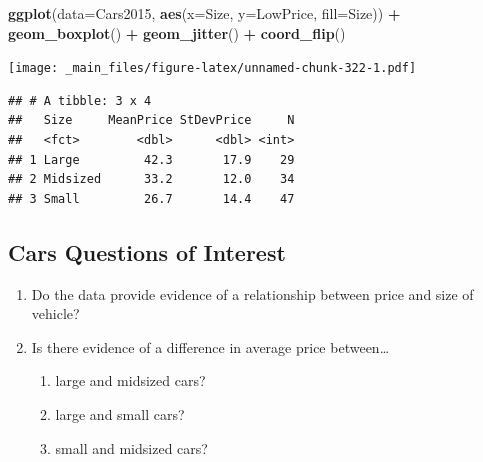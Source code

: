 \documentclass[]{book}
\newenvironment{Shaded}{\begin{snugshade}}{\end{snugshade}}
\newcommand{\KeywordTok}[1]{\textcolor[rgb]{0.13,0.29,0.53}{\textbf{#1}}}
\newcommand{\DataTypeTok}[1]{\textcolor[rgb]{0.13,0.29,0.53}{#1}}
\newcommand{\StringTok}[1]{\textcolor[rgb]{0.31,0.60,0.02}{#1}}
\newcommand{\OperatorTok}[1]{\textcolor[rgb]{0.81,0.36,0.00}{\textbf{#1}}}
\newcommand{\NormalTok}[1]{#1}
\providecommand{\tightlist}{%
  \setlength{\itemsep}{0pt}\setlength{\parskip}{0pt}}
\begin{document}
\begin{Shaded}
\begin{Highlighting}[]
\KeywordTok{ggplot}\NormalTok{(}\DataTypeTok{data=}\NormalTok{Cars2015, }\KeywordTok{aes}\NormalTok{(}\DataTypeTok{x=}\NormalTok{Size, }\DataTypeTok{y=}\NormalTok{LowPrice, }\DataTypeTok{fill=}\NormalTok{Size)) }\OperatorTok{+}\StringTok{ }
\StringTok{  }\KeywordTok{geom_boxplot}\NormalTok{() }\OperatorTok{+}\StringTok{ }\KeywordTok{geom_jitter}\NormalTok{() }\OperatorTok{+}\StringTok{ }\KeywordTok{coord_flip}\NormalTok{()}
\end{Highlighting}
\end{Shaded}

\texttt{[image: \_main\_files/figure-latex/unnamed-chunk-322-1.pdf]}

\begin{Shaded}
\end{Shaded}

\begin{verbatim}
## # A tibble: 3 x 4
##   Size     MeanPrice StDevPrice     N
##   <fct>        <dbl>      <dbl> <int>
## 1 Large         42.3       17.9    29
## 2 Midsized      33.2       12.0    34
## 3 Small         26.7       14.4    47
\end{verbatim}

\subsection{Cars Questions of
Interest}\label{cars-questions-of-interest}

\begin{enumerate}
\def\labelenumi{\arabic{enumi}.}
\item
  Do the data provide evidence of a relationship between price and size
  of vehicle?
\item
  Is there evidence of a difference in average price between\ldots{}

  \begin{enumerate}
  \def\labelenumii{\alph{enumii})}
  \tightlist
  \item
    large and midsized cars?\\
  \item
    large and small cars?\\
  \item
    small and midsized cars?
  \end{enumerate}
\end{enumerate}
\end{document}
